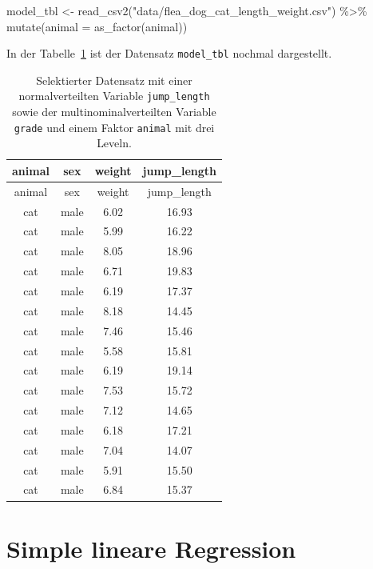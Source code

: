 \documentclass[
  letterpaper,
  DIV=11,
  oneside]{scrreport}
\newenvironment{Shaded}{\begin{snugshade}}{\end{snugshade}}
\newcommand{\AttributeTok}[1]{\textcolor[rgb]{0.40,0.45,0.13}{#1}}
\newcommand{\FunctionTok}[1]{\textcolor[rgb]{0.28,0.35,0.67}{#1}}
\newcommand{\NormalTok}[1]{\textcolor[rgb]{0.00,0.23,0.31}{#1}}
\newcommand{\OtherTok}[1]{\textcolor[rgb]{0.00,0.23,0.31}{#1}}
\newcommand{\SpecialCharTok}[1]{\textcolor[rgb]{0.37,0.37,0.37}{#1}}
\newcommand{\StringTok}[1]{\textcolor[rgb]{0.13,0.47,0.30}{#1}}
\begin{document}
\begin{Shaded}
\begin{Highlighting}[]
\NormalTok{model\_tbl }\OtherTok{\textless{}{-}} \FunctionTok{read\_csv2}\NormalTok{(}\StringTok{"data/flea\_dog\_cat\_length\_weight.csv"}\NormalTok{) }\SpecialCharTok{\%\textgreater{}\%}
  \FunctionTok{mutate}\NormalTok{(}\AttributeTok{animal =} \FunctionTok{as\_factor}\NormalTok{(animal))}
\end{Highlighting}
\end{Shaded}

In der Tabelle~\ref{tbl-model-1} ist der Datensatz \texttt{model\_tbl}
nochmal dargestellt.

\hypertarget{tbl-model-1}{}
\begin{longtable}[]{@{}cccc@{}}
\caption{\label{tbl-model-1}Selektierter Datensatz mit einer
normalverteilten Variable \texttt{jump\_length} sowie der
multinominalverteilten Variable \texttt{grade} und einem Faktor
\texttt{animal} mit drei Leveln.}\tabularnewline
\toprule()
animal & sex & weight & jump\_length \\
\midrule()
\endfirsthead
\toprule()
animal & sex & weight & jump\_length \\
\midrule()
\endhead
cat & male & 6.02 & 16.93 \\
cat & male & 5.99 & 16.22 \\
cat & male & 8.05 & 18.96 \\
cat & male & 6.71 & 19.83 \\
cat & male & 6.19 & 17.37 \\
cat & male & 8.18 & 14.45 \\
cat & male & 7.46 & 15.46 \\
cat & male & 5.58 & 15.81 \\
cat & male & 6.19 & 19.14 \\
cat & male & 7.53 & 15.72 \\
cat & male & 7.12 & 14.65 \\
cat & male & 6.18 & 17.21 \\
cat & male & 7.04 & 14.07 \\
cat & male & 5.91 & 15.50 \\
cat & male & 6.84 & 15.37 \\
\bottomrule()
\end{longtable}

\hypertarget{simple-lineare-regression}{%
\section*{Simple lineare Regression}\label{simple-lineare-regression}}
\end{document}
